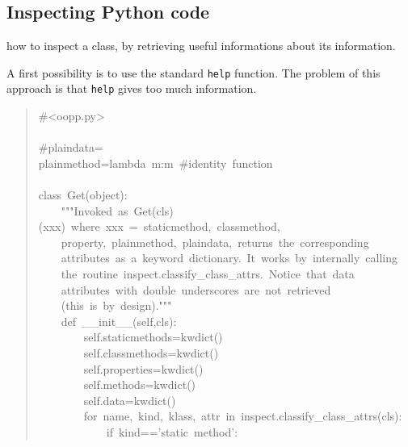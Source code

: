 \documentclass[10pt,english]{article}
\begin{document}

\hypertarget{inspecting-python-code}{}
\subsection*{Inspecting Python code}

how to inspect a class, by retrieving useful informations about its
information.

A first possibility is to use the standard \texttt{help} function.
The problem of this approach is that \texttt{help} gives too much 
information.
\begin{quote}
\begin{ttfamily}\begin{flushleft}
\mbox{{\#}<oopp.py>}\\
\mbox{}\\
\mbox{{\#}plaindata=}\\
\mbox{plainmethod=lambda~m:m~{\#}identity~function}\\
\mbox{}\\
\mbox{class~Get(object):}\\
\mbox{~~~~"""Invoked~as~Get(cls)(xxx)~where~xxx~=~staticmethod,~classmethod,}\\
\mbox{~~~~property,~plainmethod,~plaindata,~returns~the~corresponding~}\\
\mbox{~~~~attributes~as~a~keyword~dictionary.~It~works~by~internally~calling~}\\
\mbox{~~~~the~routine~inspect.classify{\_}class{\_}attrs.~Notice~that~data}\\
\mbox{~~~~attributes~with~double~underscores~are~not~retrieved~}\\
\mbox{~~~~(this~is~by~design)."""}\\
\mbox{~~~~def~{\_}{\_}init{\_}{\_}(self,cls):}\\
\mbox{~~~~~~~~self.staticmethods=kwdict()}\\
\mbox{~~~~~~~~self.classmethods=kwdict()}\\
\mbox{~~~~~~~~self.properties=kwdict()}\\
\mbox{~~~~~~~~self.methods=kwdict()}\\
\mbox{~~~~~~~~self.data=kwdict()}\\
\mbox{~~~~~~~~for~name,~kind,~klass,~attr~in~inspect.classify{\_}class{\_}attrs(cls):}\\
\mbox{~~~~~~~~~~~~if~kind=='static~method':}\\

\end{flushleft}
\end{ttfamily}
\end{quote}
\end{document}
